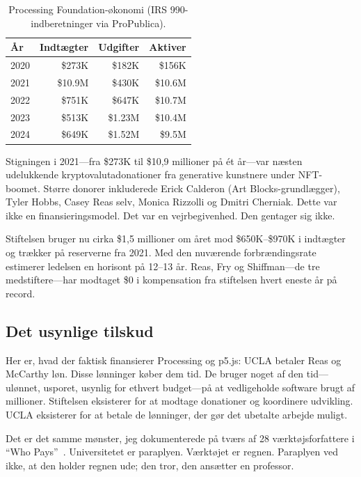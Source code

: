 \documentclass[10pt,letterpaper,twocolumn]{article}
\begin{document}
\begin{table}[h]
\small
\centering
\begin{tabularx}{\columnwidth}{Xrrr}
\toprule
\textbf{År} & \textbf{Indtægter} & \textbf{Udgifter} & \textbf{Aktiver} \\
\midrule
2020 & \$273K & \$182K & \$156K \\
2021 & \$10.9M & \$430K & \$10.6M \\
2022 & \$751K & \$647K & \$10.7M \\
2023 & \$513K & \$1.23M & \$10.4M \\
2024 & \$649K & \$1.52M & \$9.5M \\
\bottomrule
\end{tabularx}
\caption{Processing Foundation-økonomi (IRS 990-indberetninger via ProPublica).}
\label{tab:pf-financials}
\end{table}

Stigningen i 2021---fra \$273K til \$10,9 millioner på ét år---var næsten udelukkende kryptovalutadonationer fra generative kunstnere under NFT-boomet. Større donorer inkluderede Erick Calderon (Art Blocks-grundlægger), Tyler Hobbs, Casey Reas selv, Monica Rizzolli og Dmitri Cherniak. Dette var ikke en finansieringsmodel. Det var en vejrbegivenhed. Den gentager sig ikke.

Stiftelsen bruger nu cirka \$1,5 millioner om året mod \$650K--\$970K i indtægter og trækker på reserverne fra 2021. Med den nuværende forbrændingsrate estimerer ledelsen en horisont på 12--13 år. Reas, Fry og Shiffman---de tre medstiftere---har modtaget \$0 i kompensation fra stiftelsen hvert eneste år på record.

\subsection{Det usynlige tilskud}

Her er, hvad der faktisk finansierer Processing og p5.js: UCLA betaler Reas og McCarthy løn. Disse lønninger køber dem tid. De bruger noget af den tid---ulønnet, usporet, usynlig for ethvert budget---på at vedligeholde software brugt af millioner. Stiftelsen eksisterer for at modtage donationer og koordinere udvikling. UCLA eksisterer for at betale de lønninger, der gør det ubetalte arbejde muligt.

Det er det samme mønster, jeg dokumenterede på tværs af 28 værktøjsforfattere i ``Who Pays''~\citep{scudder2026sustainability}. Universitetet er paraplyen. Værktøjet er regnen. Paraplyen ved ikke, at den holder regnen ude; den tror, den ansætter en professor.
\end{document}
